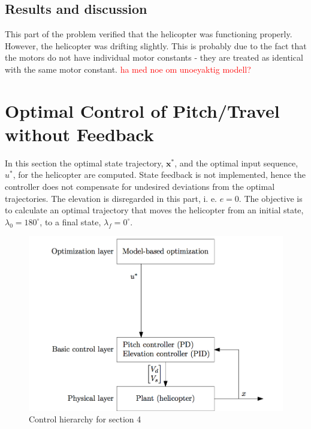 \documentclass[11pt,a4paper,USenglish]{article} %
\begin{document}
\subsection{Results and discussion}
This part of the problem verified that the helicopter was functioning properly. However, the helicopter was drifting slightly. This is probably due to the fact that the motors do not have individual motor constants - they are treated as identical with the same motor constant. \textcolor{red}{ha med noe om unoeyaktig modell?}

\section{Optimal Control of Pitch/Travel without Feedback}\label{sec:prob2}

In this section the optimal state trajectory, $\mathbf{x}^*$, and the optimal input sequence, $u^*$, for the helicopter are computed. State feedback is not implemented, hence the controller does not compensate for undesired deviations from the optimal trajectories. The elevation is disregarded in this part, i. e. $e = 0$. The objective is to calculate an optimal trajectory that moves the helicopter from an initial state, $\lambda_0 = 180^{\circ}$, to a final state, $\lambda_f = 0^{\circ}$.

\begin{figure}[!h]
    \begin{minipage}{\textwidth}
\centerline{\includegraphics[width=1.0\textwidth]{10_2bilde}}
    \end{minipage}
    \caption{Control hierarchy for section 4}
	\label{fig:10_2bilde}
\end{figure}
\end{document}
